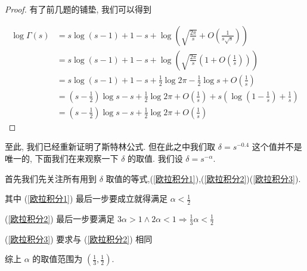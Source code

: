 \begin{proof}
	有了前几题的铺垫, 我们可以得到

	\begin{equation*}
		\begin{aligned}
			\log\Gamma(s) &= s \log(s-1) + 1 - s + \log \left(\sqrt{ \frac{2\pi}{s} }+O\left(\frac{1}{s\sqrt{s}}\right)\right) \\
			&=s\log(s-1)+1-s+ \log\left(\sqrt{\frac{2\pi}{s}}\left(1+O\left(\frac{1}{s}\right)\right)\right) \\
			&=s \log(s-1) + 1- s + \frac{1}{2} \log 2\pi - \frac{1}{2}\log s + O\left(\frac{1}{s}\right) \\
			&=(s-\frac{1}{2})\log s - s +\frac{1}{2}\log 2\pi + O\left(\frac{1}{s}\right) + s \left(\log\left(1 - \frac{1}{s}\right) + \frac 1 s \right)\\
			&=(s-\frac{1}{2})\log s - s +\frac{1}{2}\log 2\pi + O\left(\frac{1}{s}\right)
		\end{aligned}
	\end{equation*}
\end{proof}

至此, 我们已经重新证明了斯特林公式. 但在此之中我们取 $\delta=s^{-0.4}$ 这个值并不是唯一的, 下面我们在来观察一下 $\delta$ 的取值. 我们设 $\delta=s^{-\alpha}$.

首先我们先关注所有用到 $\delta$ 取值的等式,(\ref{欧拉积分1}),(\ref{欧拉积分2})(\ref{欧拉积分3}).

其中 (\ref{欧拉积分1}) 最后一步要成立就得满足 $\alpha<\frac 1 2$

(\ref{欧拉积分2}) 最后一步要满足 $3\alpha>1 \wedge 2\alpha<1 \Rightarrow \frac 1 3\alpha<\frac1 2$

(\ref{欧拉积分3}) 要求与 (\ref{欧拉积分2}) 相同

综上 $\alpha$ 的取值范围为 $(\frac 1 3,\frac 1 2)$.

\specialfalse